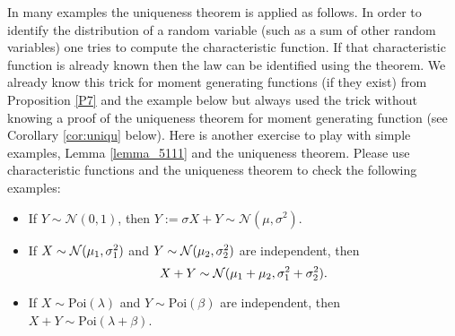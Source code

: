 
In many examples the uniqueness theorem is applied as follows. In order to identify the distribution of a random variable (such as a sum of other random variables) one tries to compute the characteristic function. If that characteristic function is already known then the law can be identified using the theorem. We already know this trick for moment generating functions (if they exist) from Proposition \ref{P7} and the example below but always used the trick without knowing a proof of the uniqueness theorem for moment generating function (see Corollary \ref{cor:uniqu} below). Here is another exercise to play with simple examples, Lemma \ref{lemma_5111} and the uniqueness theorem. Please use characteristic functions and the uniqueness theorem to check the following examples:
\begin{luebung}
	\begin{itemize}
		\item If $Y\sim \mathcal N(0,1)$, then $Y:=\sigma X+Y\sim \mathcal N(\mu,\sigma^2)$.
		\item
		If $X \sim \mathcal{N}(\mu_1,\sigma_1^2)$ and $Y \sim \mathcal{N}(\mu_2,\sigma_2^2)$ are independent, then $$X+Y \sim \mathcal{N}(\mu_1+\mu_2, \sigma_1^2 + \sigma_2^2).$$
	\item
		If $X \sim \text{Poi}(\lambda)$ and $Y \sim \text{Poi}(\beta)$ are independent, then $X + Y \sim \text{Poi}(\lambda + \beta)$. 
	\end{itemize}
\end{luebung}



